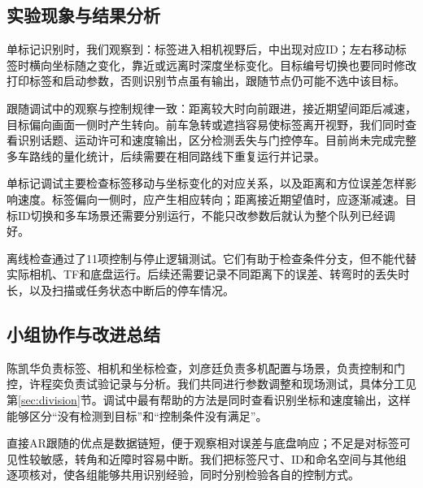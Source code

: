 \subsection{实验现象与结果分析}
单标记识别时，我们观察到：标签进入相机视野后，中出现对应ID；左右移动标签时横向坐标随之变化，靠近或远离时深度坐标变化。目标编号切换也要同时修改打印标签和启动参数，否则识别节点虽有输出，跟随节点仍可能不选中该目标。

跟随调试中的观察与控制规律一致：距离较大时向前跟进，接近期望间距后减速，目标偏向画面一侧时产生转向。前车急转或遮挡容易使标签离开视野，我们同时查看识别话题、运动许可和速度输出，区分检测丢失与门控停车。目前尚未完成完整多车路线的量化统计，后续需要在相同路线下重复运行并记录。


单标记调试主要检查标签移动与坐标变化的对应关系，以及距离和方位误差怎样影响速度。标签偏向一侧时，应产生相应转向；距离接近期望值时，应逐渐减速。目标ID切换和多车场景还需要分别运行，不能只改参数后就认为整个队列已经调好。

离线检查通过了11项控制与停止逻辑测试。它们有助于检查条件分支，但不能代替实际相机、TF和底盘运行。后续还需要记录不同距离下的误差、转弯时的丢失时长，以及扫描或任务状态中断后的停车情况。

\subsection{小组协作与改进总结}
陈凯华负责标签、相机和坐标检查，刘彦廷负责多机配置与场景，\LuoMin{}负责控制和门控，许程奕负责试验记录与分析。我们共同进行参数调整和现场测试，具体分工见第\ref{sec:division}节。调试中最有帮助的方法是同时查看识别坐标和速度输出，这样能够区分“没有检测到目标”和“控制条件没有满足”。


直接AR跟随的优点是数据链短，便于观察相对误差与底盘响应；不足是对标签可见性较敏感，转角和近障时容易中断。我们把标签尺寸、ID和命名空间与其他组逐项核对，使各组能够共用识别经验，同时分别检验各自的控制方式。
